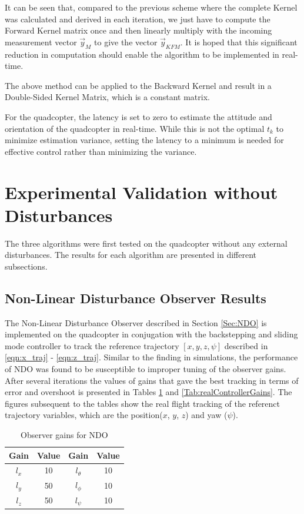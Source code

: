\documentclass[letterpaper%
, twoside%
, 12pt%
,memoire%
, english%
,creativecommons,hyperref%
]{thETS}
\begin{document}
It can be seen that, compared to the previous scheme where the complete Kernel was calculated and derived in each iteration, we just have to compute the Forward Kernel matrix once and then linearly multiply with the incoming measurement vector $\vec{y}_M$ to give the vector $\vec{y}_{KFM}$.
It is hoped that this significant reduction in computation should enable the algorithm to be implemented in real-time. 

The above method can be applied to the Backward Kernel and result in a Double-Sided Kernel Matrix, which is a constant matrix.

For the quadcopter, the latency is set to zero to estimate the attitude and orientation of the quadcopter in real-time. While this is not the optimal $t_k$ to minimize estimation variance, setting the latency to a minimum is needed for effective control rather than minimizing the variance. 

\section{Experimental Validation without Disturbances}
The three algorithms were first tested on the quadcopter without any external disturbances. The results for each algorithm are presented in different subsections. 
\subsection{Non-Linear Disturbance Observer Results}
The Non-Linear Disturbance Observer described in Section \ref{Sec:NDO} is implemented on the quadcopter in conjugation with the backstepping and sliding mode controller to track the reference trajectory $[x,y,z,\psi]$ described in \eqref{eqn:x_traj} - \eqref{eqn:z_traj}. Similar to the finding in simulations, the performance of NDO was found to be susceptible to improper tuning of the observer gains. After several iterations the values of gains that gave the best tracking in terms of error and overshoot is presented in Tables \ref{Tab:realNDOGains} and \ref{Tab:realControllerGains}. The figures subsequent to the tables show the real flight tracking of the referenct trajectory variables, which are the position($x$, $y$, $z$) and yaw ($\psi$). 
\begin{table}
\parbox{0.65\textwidth}{\caption{Observer gains for NDO}\label{Tab:realNDOGains}}
\begin{tabular}{|c|c|c|c|}
\hline
{\bf Gain}&{\bf Value}&{\bf Gain}&{\bf Value}\\ \hline
$l_x$ & 10 & $l_\theta$  & 10  \\ \hline
$l_y$ & 50 & $l_\phi$    & 10  \\ \hline
$l_z$ & 50 & $l_\psi$    & 10  \\ \hline 
\end{tabular}
\end{table}
\end{document}
